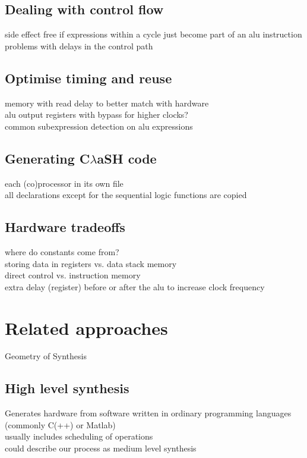 \documentclass[preprint]{sigplanconf}
\def\clash{C$\lambda$aSH\xspace}
\begin{document}
\subsection{Dealing with control flow}
side effect free if expressions within a cycle just become part of an alu instruction \\
problems with delays in the control path

\subsection{Optimise timing and reuse}
memory with read delay to better match with hardware \\
alu output registers with bypass for higher clocks? \\
common subexpression detection on alu expressions

\subsection{Generating \clash code}
each (co)processor in its own file \\
all declarations except for the sequential logic functions are copied

\subsection{Hardware tradeoffs}
where do constants come from? \\
storing data in registers vs. data stack memory \\
direct control vs. instruction memory \\
extra delay (register) before or after the alu to increase clock frequency

\section{Related approaches}

Geometry of Synthesis \cite{Ghica}

\subsection{High level synthesis}
Generates hardware from software written in ordinary programming languages (commonly C(++) or Matlab)\\
usually includes scheduling of operations \\
could describe our process as medium level synthesis
\end{document}

